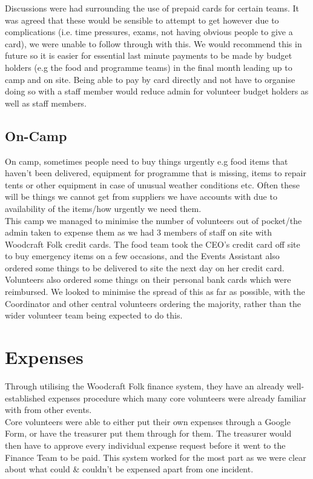 Discussions were had surrounding the use of prepaid cards for certain teams. It was agreed that these would be sensible to attempt to get however due to complications (i.e. time pressures, exams, not having obvious people to give a card), we were unable to follow through with this. We would recommend this in future so it is easier for essential last minute payments to be made by budget holders (e.g the food and programme teams) in the final month leading up to camp and on site. Being able to pay by card directly and not have to organise doing so with a staff member would reduce admin for volunteer budget holders as well as staff members.

\subsection{On-Camp}
On camp, sometimes people need to buy things urgently e.g food items that haven't been delivered, equipment for programme that is missing, items to repair tents or other equipment in case of unusual weather conditions etc. Often these will be things we cannot get from suppliers we have accounts with due to availability of the items/how urgently we need them.\\

This camp we managed to minimise the number of volunteers out of pocket/the admin taken to expense them as we had 3 members of staff on site with Woodcraft Folk credit cards. The food team took the CEO's credit card off site to buy emergency items on a few occasions, and the Events Assistant also ordered some things to be delivered to site the next day on her credit card.\\

Volunteers also ordered some things on their personal bank cards which were reimbursed. We looked to minimise the spread of this as far as possible, with the Coordinator and other central volunteers ordering the majority, rather than the wider volunteer team being expected to do this.

\section{Expenses}
Through utilising the Woodcraft Folk finance system, they have an already well-established expenses procedure which many core volunteers were already familiar with from other events. \\

Core volunteers were able to either put their own expenses through a Google Form, or have the treasurer put them through for them. The treasurer would then have to approve every individual expense request before it went to the Finance Team to be paid. This system worked for the most part as we were clear about what could \& couldn't be expensed apart from one incident.\\

